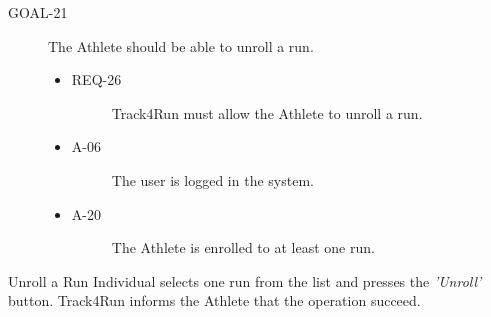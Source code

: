 \documentclass[a4paper]{article}
\newcommand{\requirement}{\ding{229}}%
\begin{document}
        \begin{description}
        	\item[GOAL-21] The Athlete should be able to unroll a run.
            	\begin{itemize}
            	    \item[\requirement]
                	\begin{description}
                	\item[REQ-26] Track4Run must allow the Athlete to unroll a run.
                	\end{description}
                	\item
                	\begin{description}
                	\item[A-06] The user is logged in the system.
                	\end{description}
                	\item
                	\begin{description}
                	\item[A-20] The Athlete is enrolled to at least one run.
                	\end{description}
                	\end{itemize}
        \end{description}
        
        \begin{usecase}{Unroll a Run}
              {Individual selects one run from the list and presses the \textit{'Unroll'} button.}
              {Track4Run informs the Athlete that the operation succeed.}
        \end{usecase}
        
\end{document}
